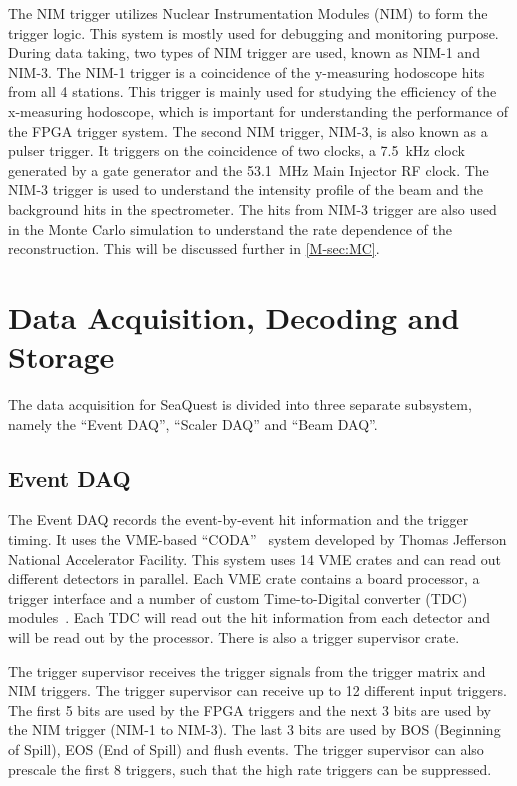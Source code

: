 \documentclass[../main.tex]{subfiles}
\begin{document}
The NIM trigger utilizes Nuclear Instrumentation Modules (NIM) to form the trigger
logic. This system is mostly used for debugging and monitoring purpose.
During data taking, two types of NIM trigger are used, known as NIM-1
and NIM-3. The NIM-1 trigger is a coincidence of the y-measuring hodoscope hits
from all 4 stations. This trigger is mainly used for studying the efficiency
of the x-measuring hodoscope, which is important for understanding the performance
of the FPGA trigger system. The second NIM trigger, NIM-3, is also known as a
pulser trigger. It triggers on the coincidence of two clocks, a \SI{7.5}{\kHz}
clock generated by a gate generator and the \SI{53.1}{\MHz} Main Injector
RF clock. The NIM-3 trigger is used to understand the intensity profile of the
beam and the background hits in the spectrometer. The hits from NIM-3 trigger
are also used in the Monte Carlo simulation to understand the rate dependence
of the reconstruction. This will be discussed further in \cref{M-sec:MC}.

\section{Data Acquisition, Decoding and Storage}
The data acquisition for SeaQuest is divided into three separate subsystem, namely
the ``Event DAQ'', ``Scaler DAQ'' and ``Beam DAQ''.

\subsection{Event DAQ}
The Event DAQ records the event-by-event hit information and the trigger timing.
It uses the VME-based ``CODA''~\cite{CODA} system developed by Thomas Jefferson National Accelerator
Facility. This system uses 14 VME crates and can read out different detectors in parallel.
Each VME crate contains a board processor, a trigger interface and a number of custom Time-to-Digital
converter (TDC) modules~\cite{wang2014a}.
Each TDC will read out the hit information from each detector and will be read out by the processor.
There is also a trigger supervisor crate.

The trigger supervisor receives the trigger signals from the trigger matrix and NIM triggers. The trigger supervisor
can receive up to 12 different input triggers. The first 5 bits are used by the FPGA triggers
and the next 3 bits are used by the NIM trigger (NIM-1 to NIM-3). The last 3 bits
are used by BOS (Beginning of Spill), EOS (End of Spill) and flush events.
The trigger supervisor can also prescale the first 8 triggers, such that the high rate triggers can be suppressed.
\end{document}
